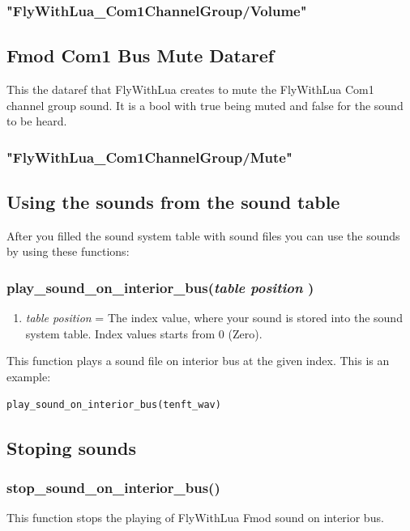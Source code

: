 \documentclass[11pt,parskip=half,a4paper]{scrartcl}
\begin{document}
\subsubsection{"FlyWithLua\_Com1ChannelGroup/Volume"}

\subsection{Fmod Com1 Bus Mute Dataref}
This the dataref that FlyWithLua creates to mute the FlyWithLua Com1 channel group sound. It is a bool with true being muted and false for the sound to be heard.

\subsubsection{"FlyWithLua\_Com1ChannelGroup/Mute"}


\newpage
\subsection{Using the sounds from the sound table}

After you filled the sound system table with sound files you can use the sounds by using these functions:

\subsubsection{ play\_sound\_on\_interior\_bus(\emph{table position} )}

\begin{enumerate}
	\item \emph{table position} = The index value, where your sound is stored into the sound system table. Index values starts from 0 (Zero).
\end{enumerate}

This function plays a sound file on interior bus at the given index. This is an example:


\begin{lstlisting}
play_sound_on_interior_bus(tenft_wav)
\end{lstlisting}


\subsection{Stoping sounds}
\subsubsection{ stop\_sound\_on\_interior\_bus()}
This function stops the playing of FlyWithLua Fmod sound on interior bus.
\end{document}

